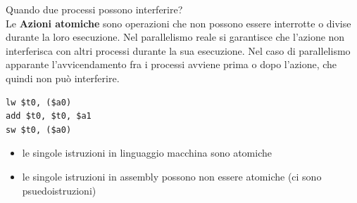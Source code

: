 \documentclass[a4paper,12pt]{article}
\begin{document}
Quando due processi possono interferire? \\
Le \textbf{Azioni atomiche} sono operazioni che non possono essere interrotte o divise durante la loro esecuzione. Nel parallelismo reale si garantisce che l'azione non interferisca con altri processi durante la sua esecuzione. Nel caso di parallelismo apparante l'avvicendamento fra i processi avviene prima o dopo l'azione, che quindi non può interferire.
\begin{lstlisting}[language={[x86masm]Assembler}]
lw $t0, ($a0)
add $t0, $t0, $a1
sw $t0, ($a0)
\end{lstlisting}
\begin{itemize}
  \item le singole istruzioni in linguaggio macchina sono atomiche
  \item le singole istruzioni in assembly possono non essere atomiche (ci sono psuedoistruzioni)
\end{itemize}
\end{document}
